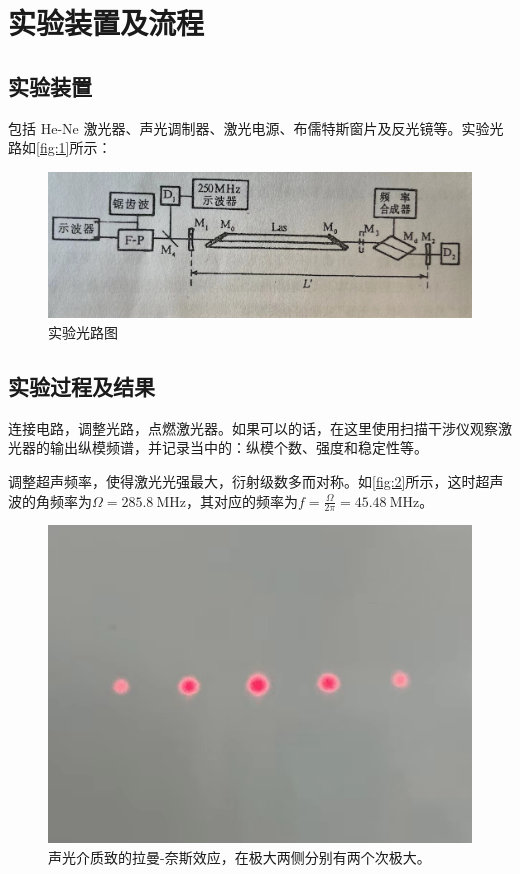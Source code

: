 \documentclass[font=default]{mpltx}
\newcommand{\note}[1]{{\color{gray}#1}}
\begin{document}
\section{实验装置及流程}
\subsection{实验装置}
包括 He-Ne 激光器、声光调制器、激光电源、布儒特斯窗片及反光镜等。实验光路如\autoref{fig:1}所示：

\begin{figure}
    \centering
    \includegraphics[width=0.85\linewidth]{fig/1.jpg}
    \caption{实验光路图\cite{laser}}
    \label{fig:1}
\end{figure}

\subsection{实验过程及结果}
连接电路，调整光路，点燃激光器。\note{如果可以的话，在这里使用扫描干涉仪观察激光器的输出纵模频谱，并记录当中的：纵模个数、强度和稳定性等。}\par
调整超声频率，使得激光光强最大，衍射级数多而对称。如\autoref{fig:2}所示，这时超声波的角频率为$\Omega=\qty{285.8}{\MHz}$，其对应的频率为$f=\frac{\Omega}{2\pi}=\qty{45.48}{\MHz}$。

\begin{figure}
    \centering
    \includegraphics[width=0.45\linewidth]{fig/2.jpg}
    \caption{声光介质致的拉曼-奈斯效应，在极大两侧分别有两个次极大。}
    \label{fig:2}
\end{figure}
\end{document}
